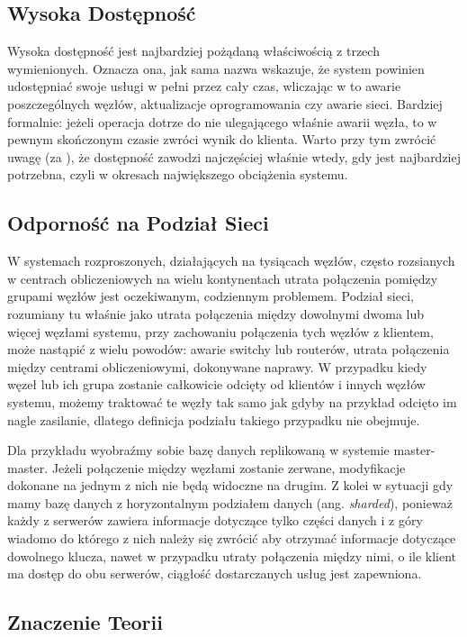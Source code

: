 \subsection*{Wysoka Dostępność}

Wysoka dostępność jest najbardziej pożądaną właściwością z trzech wymienionych.
Oznacza ona, jak sama nazwa wskazuje, że system powinien udostępniać swoje usługi w pełni przez cały czas, wliczając w to awarie poszczególnych węzłów, aktualizacje oprogramowania czy awarie sieci. 
Bardziej formalnie: jeżeli operacja dotrze do nie ulegającego właśnie awarii węzła, to w pewnym skończonym czasie zwróci wynik do klienta.
Warto przy tym zwrócić uwagę (za  \cite{brewers-conjecture}), że dostępność zawodzi najczęściej właśnie wtedy, gdy jest najbardziej potrzebna, czyli w okresach największego obciążenia systemu.

\subsection*{Odporność na Podział Sieci}

W systemach rozproszonych, działających na tysiącach węzłów, często rozsianych w centrach obliczeniowych na wielu kontynentach utrata połączenia pomiędzy grupami węzłów jest oczekiwanym, codziennym problemem.
Podział sieci, rozumiany tu właśnie jako utrata połączenia między dowolnymi dwoma lub więcej węzłami systemu, przy zachowaniu połączenia tych węzłów z klientem, może nastąpić z wielu powodów: awarie switchy lub routerów, utrata połączenia między centrami obliczeniowymi, dokonywane naprawy.
W przypadku kiedy węzeł lub ich grupa zostanie całkowicie odcięty od klientów i innych węzłów systemu, możemy traktować te węzły tak samo jak gdyby na przykład odcięto im nagle zasilanie, dlatego definicja podziału takiego przypadku nie obejmuje.

Dla przykładu wyobraźmy sobie bazę danych replikowaną w systemie master-master.
Jeżeli połączenie między węzłami zostanie zerwane, modyfikacje dokonane na jednym z nich nie będą widoczne na drugim. 
Z kolei w sytuacji gdy mamy bazę danych z horyzontalnym podziałem danych (ang. \emph{sharded}), ponieważ każdy z serwerów zawiera informacje dotyczące tylko części danych i z góry wiadomo do którego z nich należy się zwrócić aby otrzymać informacje dotyczące dowolnego klucza, nawet w przypadku utraty połączenia między nimi, o ile klient ma dostęp do obu serwerów, ciągłość dostarczanych usług jest zapewniona.

\subsection*{Znaczenie Teorii}

